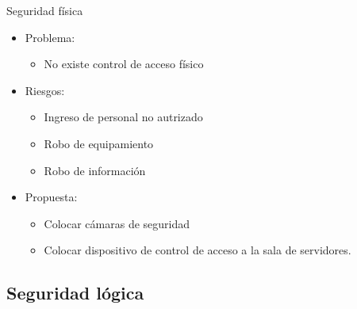 \documentclass[spanish]{beamer}
\begin{document}
\begin{frame}{Seguridad física}
  \begin{itemize}
  \item Problema:
    \begin{itemize}
    \item No existe control de acceso físico
    \end{itemize}
  \item Riesgos:
    \begin{itemize}
    \item Ingreso de personal no autrizado
    \item Robo de equipamiento
    \item Robo de información
    \end{itemize}
  \item Propuesta:
    \begin{itemize}
    \item Colocar cámaras de seguridad
    \item Colocar dispositivo de control de acceso a la sala de
      servidores.
    \end{itemize}
  \end{itemize}
\end{frame}


\subsection{Seguridad lógica}
\end{document}
